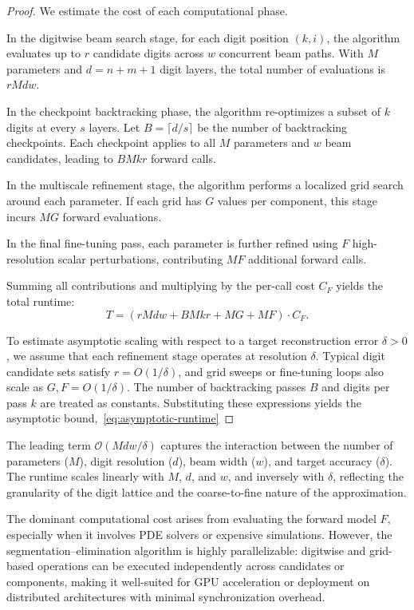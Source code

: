 \documentclass[aps,twocolumn,superscriptaddress,nofootinbib]{revtex4}
\begin{document}
\begin{proof}
We estimate the cost of each computational phase.

In the digitwise beam search stage, for each digit position $(k, i)$, the algorithm evaluates up to $r$ candidate digits across $w$ concurrent beam paths. With $M$ parameters and $d = n + m + 1$ digit layers, the total number of evaluations is $r M d w$.

In the checkpoint backtracking phase, the algorithm re-optimizes a subset of $k$ digits at every $s$ layers. Let $B = \lceil d / s \rceil$ be the number of backtracking checkpoints. Each checkpoint applies to all $M$ parameters and $w$ beam candidates, leading to $B M k r$ forward calls.

In the multiscale refinement stage, the algorithm performs a localized grid search around each parameter. If each grid has $G$ values per component, this stage incurs $M G$ forward evaluations.

In the final fine-tuning pass, each parameter is further refined using $F$ high-resolution scalar perturbations, contributing $M F$ additional forward calls.

Summing all contributions and multiplying by the per-call cost $C_F$ yields the total runtime:
\[
T = \left(r M d w + B M k r + M G + M F\right) \cdot C_F.
\]

To estimate asymptotic scaling with respect to a target reconstruction error $\delta > 0$, we assume that each refinement stage operates at resolution $\delta$. Typical digit candidate sets satisfy $r = O(1/\delta)$, and grid sweeps or fine-tuning loops also scale as $G, F = O(1/\delta)$. The number of backtracking passes $B$ and digits per pass $k$ are treated as constants. Substituting these expressions yields the asymptotic bound,~\eqref{eq:asymptotic-runtime}
\end{proof}

The leading term $\mathcal{O}(Mdw/\delta)$ captures the interaction between the number of parameters ($M$), digit resolution ($d$), beam width ($w$), and target accuracy ($\delta$). The runtime scales linearly with $M$, $d$, and $w$, and inversely with $\delta$, reflecting the granularity of the digit lattice and the coarse-to-fine nature of the approximation.

The dominant computational cost arises from evaluating the forward model $F$, especially when it involves PDE solvers or expensive simulations. However, the segmentation--elimination algorithm is highly parallelizable: digitwise and grid-based operations can be executed independently across candidates or components, making it well-suited for GPU acceleration or deployment on distributed architectures with minimal synchronization overhead.
\end{document}
